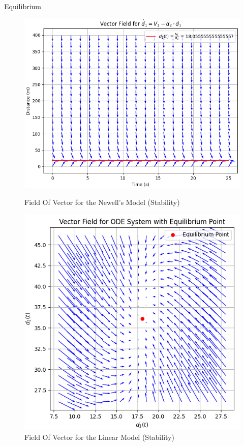 \documentclass{beamer}
\begin{document}
\begin{frame}{Equilibrium}
	\begin{figure}[H]
		\centering
		\begin{minipage}[t]{0.46\textwidth}
			\centering
			\includegraphics[width=1\linewidth]{FieldOfVector_CV.png}
			\caption{Field Of Vector for the Newell's Model (Stability)}
		\end{minipage}
		\hfill 
		\begin{minipage}[t]{0.51\textwidth}
			\centering
			\includegraphics[width=0.9\linewidth]{FieldOfVector_CV2.png}
			\caption{Field Of Vector for the Linear Model (Stability)}
			\label{fig:FV1}
		\end{minipage}
		\label{fig:CombinedFigures}
	\end{figure}
\end{frame}
\end{document}

